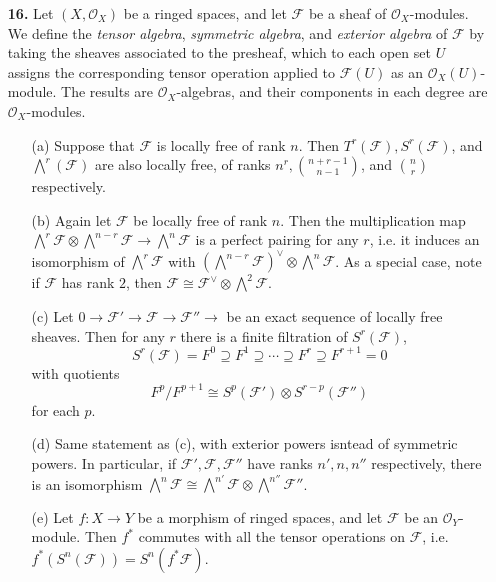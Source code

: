 \documentclass{article}
\newcommand{\fF}{\mathcal{F}}
\newcommand{\fO}{\mathcal{O}}
\begin{document}
\begin{enumerate} [label=\textbf{\arabic*.}, leftmargin=0em]
\item[\textbf{16.}] Let $(X, \fO_X)$ be a ringed spaces, and let $\fF$ be a sheaf of $\fO_X$-modules. We define the \textit{tensor algebra}, \textit{symmetric algebra}, and \textit{exterior algebra} of $\fF$ by taking the sheaves associated to the presheaf, which to each open set $U$ assigns the corresponding tensor operation applied to $\fF(U)$ as an $\fO_X(U)$-module. The results are $\fO_X$-algebras, and their components in each degree are $\fO_X$-modules.
\begin{itemize} [leftmargin=0cm]
    \item[(a)] Suppose that $\fF$ is locally free of rank $n$. Then $T^r(\fF), S^r(\fF)$, and $\bigwedge^r(\fF)$ are also locally free, of ranks $n^r, {n + r - 1 \choose n - 1}$, and ${n \choose r}$ respectively.
    \item[(b)] Again let $\fF$ be locally free of rank $n$. Then the multiplication map $\bigwedge^r \fF \otimes \bigwedge^{n - r} \fF \to \bigwedge^n \fF$ is a perfect pairing for any $r$, i.e. it induces an isomorphism of $\bigwedge^r \fF$ with $(\bigwedge^{n - r} \fF)^\vee \otimes \bigwedge^n \fF$. As a special case, note if $\fF$ has rank $2$, then $\fF \cong \fF^\vee \otimes \bigwedge^2 \fF$.
    \item[(c)] Let $0 \to \fF' \to \fF \to \fF'' \to $ be an exact sequence of locally free sheaves. Then for any $r$ there is a finite filtration of $S^r(\fF)$,
    \begin{equation*}
        S^r(\fF) = F^0 \supseteq F^1 \supseteq \cdots \supseteq F^r \supseteq F^{r + 1} = 0
    \end{equation*}
    with quotients
    \begin{equation*}
        F^p / F^{p + 1} \cong S^p(\fF') \otimes S^{r - p}(\fF'')
    \end{equation*}
    for each $p$.
    \item[(d)] Same statement as (c), with exterior powers isntead of symmetric powers. In particular, if $\fF', \fF, \fF''$ have ranks $n', n, n''$ respectively, there is an isomorphism $\bigwedge^n \fF \cong \bigwedge^{n'} \fF \otimes \bigwedge^{n''} \fF''$.
    \item[(e)] Let $f : X \to Y$ be a morphism of ringed spaces, and let $\fF$ be an $\fO_Y$-module. Then $f^*$ commutes with all the tensor operations on $\fF$, i.e. $f^*(S^n(\fF)) = S^n(f^* \fF)$.
\end{itemize}


\end{enumerate}
\end{document}
